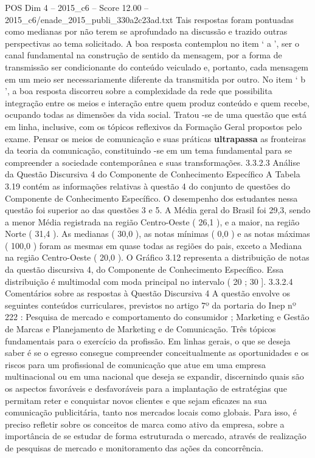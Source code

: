 \begin{textsample}{POS Dim 4 – 2015\_c6 – Score 12.00 – 2015\_c6/enade\_2015\_publi\_330a2c23ad.txt}
Tais respostas foram pontuadas como medianas por não terem se aprofundado na discussão e trazido outras perspectivas ao tema solicitado.
A boa resposta contemplou no item ‘ a ’, ser o canal fundamental na construção de sentido da mensagem, por a forma de transmissão ser condicionante do conteúdo veiculado e, portanto, cada mensagem em um meio ser necessariamente diferente da transmitida por outro.
No item ‘ b ’, a boa resposta discorreu sobre a complexidade da rede que possibilita integração entre os meios e interação entre quem produz conteúdo e quem recebe, ocupando todas as dimensões da vida social.
Tratou -se de uma questão que está em linha, inclusive, com os tópicos reflexivos da Formação Geral propostos pelo exame.
Pensar os meios de comunicação e suas práticas \textbf{ultrapassa} as fronteiras da teoria da comunicação, constituindo -se em um tema fundamental para se compreender a sociedade contemporânea e suas transformações. 3.3.2.3 Análise da Questão Discursiva 4 do Componente de Conhecimento Específico A Tabela 3.19 contém as informações relativas à questão 4 do conjunto de questões do Componente de Conhecimento Específico.
O desempenho dos estudantes nessa questão foi superior ao das questões 3 e 5.
A Média geral do Brasil foi 29,3, sendo a menor Média registrada na região Centro-Oeste ( 26,1 ), e a maior, na região Norte ( 31,4 ).
As medianas ( 30,0 ), as notas mínimas ( 0,0 ) e as notas máximas ( 100,0 ) foram as mesmas em quase todas as regiões do pais, exceto a Mediana na região Centro-Oeste ( 20,0 ).
O Gráfico 3.12 representa a distribuição de notas da questão discursiva 4, do Componente de Conhecimento Específico.
Essa distribuição é multimodal com moda principal no intervalo ( 20 ; 30 ]. 3.3.2.4 Comentários sobre as respostas à Questão Discursiva 4 A questão envolve os seguintes conteúdos curriculares, previstos no artigo 7º da portaria do Inep nº 222 : Pesquisa de mercado e comportamento do consumidor ; Marketing e Gestão de Marcas e Planejamento de Marketing e de Comunicação.
Três tópicos fundamentais para o exercício da profissão.
Em linhas gerais, o que se deseja saber é se o egresso consegue compreender conceitualmente as oportunidades e os riscos para um profissional de comunicação que atue em uma empresa multinacional ou em uma nacional que deseja se expandir, discernindo quais são os aspectos favoráveis e desfavoráveis para a implantação de estratégias que permitam reter e conquistar novos clientes e que sejam eficazes na sua comunicação publicitária, tanto nos mercados locais como globais.
Para isso, é preciso refletir sobre os conceitos de marca como ativo da empresa, sobre a importância de se estudar de forma estruturada o mercado, através de realização de pesquisas de mercado e monitoramento das ações da concorrência.

\end{textsample}
